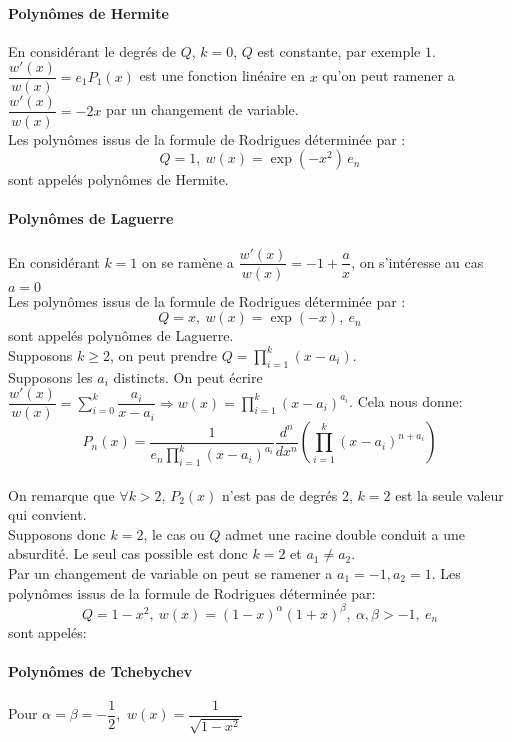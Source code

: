 \paragraph{Polynômes de Hermite}
$ $\\
En considérant le degrés de $Q$, $k=0$, $Q$ est constante, par exemple $1$.\\$\dfrac{w'(x)}{w(x)}=e_{1}P_{1}(x)$ est une fonction linéaire en $x$ qu'on peut ramener a $\dfrac{w'(x)}{w(x)}=-2x$ par un changement de variable.
\\Les polynômes issus de la formule de Rodrigues déterminée par : $$Q=1,\  w(x)=\exp(-x^{2})\, e_{n}$$ sont appelés polynômes de Hermite.

\paragraph{Polynômes de Laguerre}
$ $\\
En considérant $k=1$ on se ramène a $\dfrac{w'(x)}{w(x)}=-1+\dfrac{a}{x}$, on s'intéresse au cas $a=0$
\\Les polynômes issus de la formule de Rodrigues déterminée par : $$Q=x,\ w(x)=\exp(-x),\ e_{n}$$ sont appelés polynômes de Laguerre.
\\$ $\\$ $\\$ $\\Supposons $k\geq 2$, on peut prendre $Q=\prod\limits_{i=1}^{k}{(x-a_{i})}$.
\\Supposons les $ a_{i} $ distincts. On peut écrire $ \displaystyle{\dfrac{w'(x)}{w(x)}=\sum\limits_{i=0}^{k}{\dfrac{a_{i}}{x-a_{i}}} \Rightarrow w(x)= \prod\limits_{i=1}^{k}{(x-a_{i})^{a_{i}}}}$. Cela nous donne:
$$P_{n}(x)=\dfrac{1}{e_{n}\prod\limits_{i=1}^k{(x-a_i)^{a_i}}}\dfrac{d^{n}}{dx^{n}}(\prod\limits_{i=1}^{k}{(x-a_{i})^{n+a_{i}}})$$
\\On remarque que $ \forall k>2$, $P_2(x)$ n'est pas de degrés 2, $k=2$ est la seule valeur qui convient. 
\\Supposons donc $k=2$, le cas ou $Q$ admet une racine double conduit a une absurdité. Le seul cas possible est donc $k=2$ et $a_{1}\neq a_{2}$.
\\Par un changement de variable on peut se ramener a $a_{1}=-1, a_{2}=1$. Les polynômes issus de la formule de Rodrigues déterminée par: $$Q=1-x^{2},\ w(x)=(1-x)^{\alpha}(1+x)^{\beta},\ \alpha,\beta > -1,\ e_{n}$$
sont appelés:

\paragraph{Polynômes de Tchebychev}
$ $\\
Pour $\alpha=\beta=-\dfrac{1}{2}$,\ $w(x)=\dfrac{1}{\sqrt{1-x^{2}}}$

